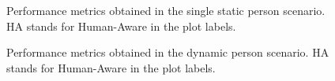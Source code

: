 \begin{figure}[t!]
\caption{Performance metrics obtained in the single static person scenario. HA stands for Human-Aware in the plot labels.}
\label{fig:boxplots_singlePerson}
\end{figure}

\begin{figure}[!]
\centering
{}%
\hspace{0.1cm}
%

\caption{Performance metrics obtained in the dynamic person scenario. HA stands for Human-Aware in the plot labels.}
\label{fig:boxplots_singlePersonMov}
\end{figure}

